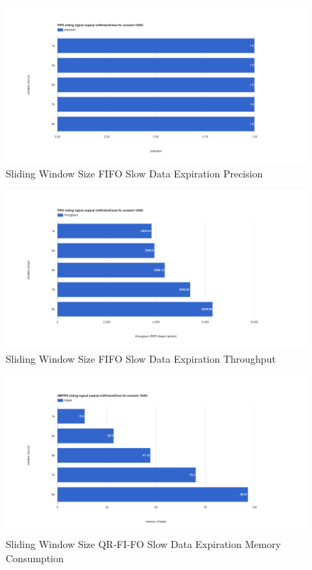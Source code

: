 \begin{figure}[!htbp]
    \centering
    \includegraphics[width=\textwidth]{img/app3-slide-ws-fifo-slow-p.png}
    \caption{Sliding Window Size FIFO Slow Data Expiration Precision}
\end{figure}
\begin{figure}[!htbp]
    \centering
    \includegraphics[width=\textwidth]{img/app3-slide-ws-fifo-slow-t.png}
    \caption{Sliding Window Size FIFO Slow Data Expiration Throughput}
\end{figure}
\begin{figure}[!htbp]
    \centering
    \includegraphics[width=\textwidth]{img/app3-slide-ws-qrfifo-slow-m.png}
    \caption{Sliding Window Size QR-FI-FO Slow Data Expiration Memory Consumption}
\end{figure}
